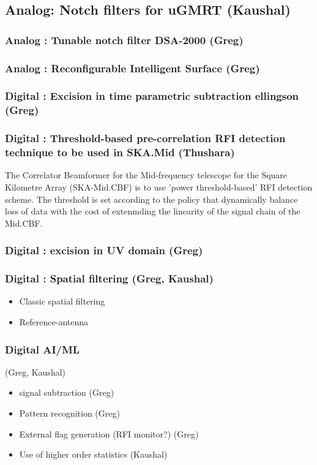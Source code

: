 \subsection{Analog: Notch filters for uGMRT (Kaushal)}
\subsubsection{Analog : Tunable notch filter DSA-2000 (Greg)}
\subsubsection{Analog : Reconfigurable Intelligent Surface (Greg)}
\subsubsection{Digital : Excision in time parametric subtraction ellingson (Greg)}

\subsubsection{Digital : Threshold-based pre-correlation RFI detection technique to be used in SKA.Mid (Thushara)}
\label{subsection:hardware:catalog:ska-mid}

The Correlator Beamformer for the Mid-frequency telescope for the Square Kilometre Array (SKA-Mid.CBF) is to use 'power threshold-based' RFI detection scheme. The threshold is set according to the policy that dynamically balance loss of data with the cost of extenmding the linearity of the signal chain of the Mid.CBF.  

\subsubsection{Digital : excision in UV domain (Greg)}
\subsubsection{Digital : Spatial filtering (Greg, Kaushal)}
\begin{itemize}
\item Classic spatial filtering
\item Reference-antenna
\end{itemize}
\subsubsection{Digital AI/ML} (Greg, Kaushal)
\begin{itemize}
\item signal subtraction (Greg)
\item Pattern recognition (Greg)
\item External flag generation (RFI monitor?) (Greg)
\item Use of higher order statistics (Kaushal)
\end{itemize}